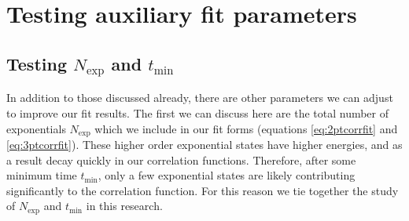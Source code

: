 


\section{Testing auxiliary fit parameters}\label{sec:other_fit_params}
\subsection{Testing $N_\mathrm{exp}$ and $t_\mathrm{min}$}\label{sec:Nmax_and_tmin}
In addition to those discussed already, there are other parameters we can adjust to improve our fit results.  The first we can discuss here are the total number of exponentials $N_\mathrm{exp}$ which we include in our fit forms (equations \ref{eq:2ptcorrfit} and \ref{eq:3ptcorrfit}).  These higher order exponential states have higher energies, and as a result decay quickly in our correlation functions.  Therefore, after some minimum time $t_\mathrm{min}$, only a few exponential states are likely contributing significantly to the correlation function.  For this reason we tie together the study of $N_\mathrm{exp}$ and $t_\mathrm{min}$ in this research.

